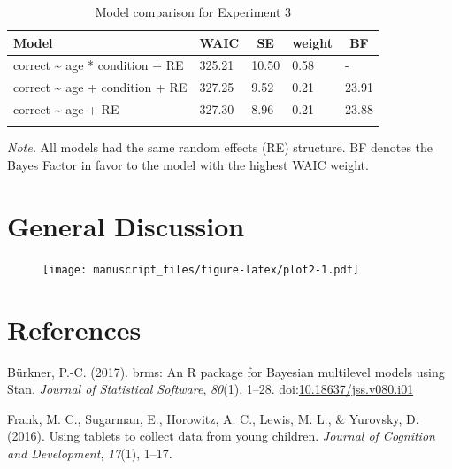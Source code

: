 \documentclass[man,floatsintext]{apa6}
\begin{document}
\begin{table}[tbp]
\begin{center}
\begin{threeparttable}
\caption{\label{tab:table3}Model comparison for Experiment 3}
\begin{tabular}{lllll}
\toprule
Model & \multicolumn{1}{c}{WAIC} & \multicolumn{1}{c}{SE} & \multicolumn{1}{c}{weight} & \multicolumn{1}{c}{BF}\\
\midrule
correct \textasciitilde{} age * condition + RE & 325.21 & 10.50 & 0.58 & -\\
correct \textasciitilde{} age + condition + RE & 327.25 & 9.52 & 0.21 & 23.91\\
correct \textasciitilde{} age + RE & 327.30 & 8.96 & 0.21 & 23.88\\
\bottomrule
\addlinespace
\end{tabular}
\begin{tablenotes}[para]
\normalsize{\textit{Note.} All models had the same random effects (RE) structure. BF denotes the Bayes Factor in favor to the model with the highest WAIC weight.}
\end{tablenotes}
\end{threeparttable}
\end{center}
\end{table}

\section{General Discussion}\label{general-discussion}

\begin{figure}
\centering
\texttt{[image: manuscript\_files/figure-latex/plot2-1.pdf]}
\caption{}
\end{figure}

\newpage

\section{References}\label{references}

\begingroup
\setlength{\parindent}{-0.5in} \setlength{\leftskip}{0.5in}

\hypertarget{refs}{}
\hypertarget{ref-R-brms_a}{}
Bürkner, P.-C. (2017). brms: An R package for Bayesian multilevel models
using Stan. \emph{Journal of Statistical Software}, \emph{80}(1), 1--28.
doi:\href{https://doi.org/10.18637/jss.v080.i01}{10.18637/jss.v080.i01}

\hypertarget{ref-frank2016using}{}
Frank, M. C., Sugarman, E., Horowitz, A. C., Lewis, M. L., \& Yurovsky,
D. (2016). Using tablets to collect data from young children.
\emph{Journal of Cognition and Development}, \emph{17}(1), 1--17.
\end{document}
